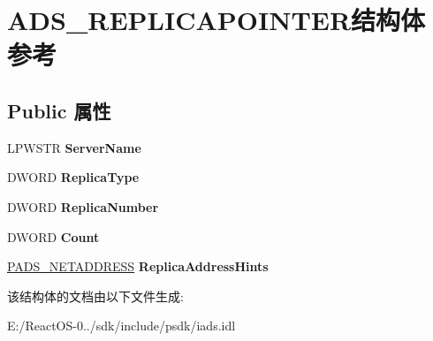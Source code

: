 \hypertarget{struct_a_d_s___r_e_p_l_i_c_a_p_o_i_n_t_e_r}{}\section{A\+D\+S\+\_\+\+R\+E\+P\+L\+I\+C\+A\+P\+O\+I\+N\+T\+E\+R结构体 参考}
\label{struct_a_d_s___r_e_p_l_i_c_a_p_o_i_n_t_e_r}
\subsection*{Public 属性}
\begin{DoxyCompactItemize}
\item 
\mbox{\label{struct_a_d_s___r_e_p_l_i_c_a_p_o_i_n_t_e_r_acd7ff4387bca0f179a598e680283416c}} 
L\+P\+W\+S\+TR {\bfseries Server\+Name}
\item 
\mbox{\label{struct_a_d_s___r_e_p_l_i_c_a_p_o_i_n_t_e_r_a38ed78ee9893e16fd37280a3a3f1e893}} 
D\+W\+O\+RD {\bfseries Replica\+Type}
\item 
\mbox{\label{struct_a_d_s___r_e_p_l_i_c_a_p_o_i_n_t_e_r_a856cd0c2e47cd89f348ca0fa63e57425}} 
D\+W\+O\+RD {\bfseries Replica\+Number}
\item 
\mbox{\label{struct_a_d_s___r_e_p_l_i_c_a_p_o_i_n_t_e_r_a176ba7a2678e0b60759787d73f4b54f1}} 
D\+W\+O\+RD {\bfseries Count}
\item 
\mbox{\label{struct_a_d_s___r_e_p_l_i_c_a_p_o_i_n_t_e_r_a27f4fe5bae810897acc44947581f3e5a}} 
\hyperlink{struct_a_d_s___n_e_t_a_d_d_r_e_s_s}{P\+A\+D\+S\+\_\+\+N\+E\+T\+A\+D\+D\+R\+E\+SS} {\bfseries Replica\+Address\+Hints}
\end{DoxyCompactItemize}


该结构体的文档由以下文件生成\+:\begin{DoxyCompactItemize}
\item 
E\+:/\+React\+O\+S-\/0../sdk/include/psdk/iads.\+idl\end{DoxyCompactItemize}
